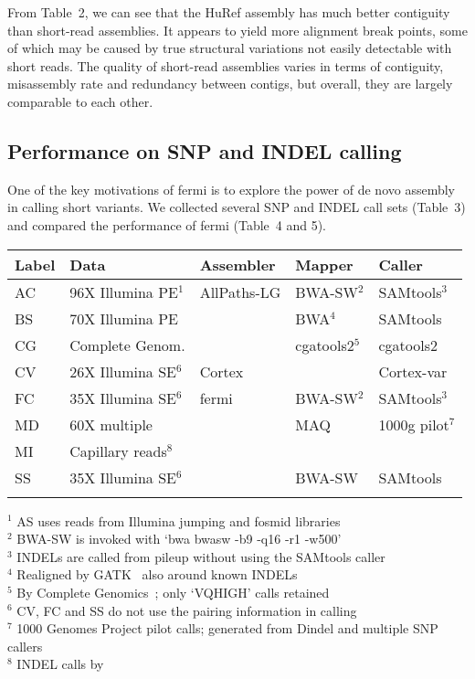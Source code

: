 \documentclass{bioinfo}
\begin{document}
From Table~2, we can see that the HuRef assembly has much better contiguity
than short-read assemblies. It appears to yield more alignment break points, some
of which may be caused by true structural variations not easily detectable with
short reads. The quality of short-read assemblies varies in terms of contiguity,
misassembly rate and redundancy between contigs, but overall, they are largely
comparable to each other.

\subsection{Performance on SNP and INDEL calling}

One of the key motivations of fermi is to explore the power of de novo assembly
in calling short variants. We collected several SNP and INDEL call sets (Table~3)
and compared the performance of fermi (Table~4 and 5).

\begin{table}[t]
{\begin{tabular}{lllll}
\toprule
Label & Data & Assembler & Mapper & Caller \\
\midrule
AC & 96X Illumina PE$^1$ & AllPaths-LG & BWA-SW$^2$ & SAMtools$^3$ \\
BS & 70X Illumina PE & & BWA$^4$ & SAMtools \\
CG & Complete Genom.& & cgatools2$^5$ & cgatools2 \\
CV & 26X Illumina SE$^6$ & Cortex & & Cortex-var \\
FC & 35X Illumina SE$^6$ & fermi & BWA-SW$^2$ & SAMtools$^3$ \\
MD & 60X multiple        & & MAQ & 1000g pilot$^7$ \\
MI & Capillary reads$^8$     & &     & \\
SS & 35X Illumina SE$^6$ & & BWA-SW & SAMtools \\
\botrule
\end{tabular}}{
$^1$ AS uses reads from Illumina jumping and fosmid libraries\\
$^2$ BWA-SW is invoked with `bwa bwasw -b9 -q16 -r1 -w500'\\
$^3$ INDELs are called from pileup without using the SAMtools caller\\
$^4$ Realigned by GATK~\citep{Depristo:2011vn} also around known INDELs\\
$^5$ By Complete Genomics~\citep{Drmanac:2010ly}; only `VQHIGH' calls retained\\
$^6$ CV, FC and SS do not use the pairing information in calling\\
$^7$ 1000 Genomes Project pilot calls; generated from Dindel and multiple SNP callers\\
$^8$ INDEL calls by \citet{Mills:2011fk}\\
}
\end{table}
\end{document}
